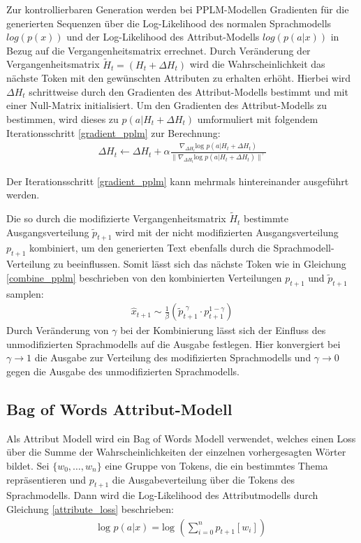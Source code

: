 Zur kontrollierbaren Generation werden bei PPLM-Modellen Gradienten für die generierten Sequenzen über die Log-Likelihood des normalen Sprachmodells $log(p(x))$ und der Log-Likelihood des Attribut-Modells $log(p(a|x))$ in Bezug auf die Vergangenheitsmatrix errechnet. 
Durch Veränderung der Vergangenheitsmatrix $\tilde{H}_t = (H_t+\Delta H_t)$ wird die Wahrscheinlichkeit das nächste Token mit den gewünschten Attributen zu erhalten erhöht. 
Hierbei wird $\Delta H_t$ schrittweise durch den Gradienten des Attribut-Modells bestimmt und mit einer Null-Matrix initialisiert.
Um den Gradienten des Attribut-Modells zu bestimmen, wird dieses zu $p(a|H_t+\Delta H_t)$ umformuliert mit folgendem Iterationsschritt \ref{gradient_pplm} zur Berechnung:
\begin{align}
    \label{gradient_pplm}
\Delta H_t \leftarrow \Delta H_t + \alpha \frac{\nabla_{\Delta H_t} \text{log }p(a|H_t+\Delta H_t)}{\| \nabla_{\Delta H_t} \text{log }p(a|H_t+\Delta H_t)\|^\gamma}
\end{align}

Der Iterationsschritt \ref{gradient_pplm} kann mehrmals hintereinander ausgeführt werden.

Die so durch die modifizierte Vergangenheitsmatrix $\tilde{H}_t$ bestimmte Ausgangsverteilung $\tilde{p}_{t+1}$ wird mit der nicht modifizierten Ausgangsverteilung $p_{t+1}$ kombiniert, um den generierten Text ebenfalls durch die Sprachmodell-Verteilung zu beeinflussen.
Somit lässt sich das nächste Token wie in Gleichung \ref{combine_pplm} beschrieben von den kombinierten Verteilungen $p_{t+1}$ und $\tilde{p}_{t+1}$ samplen: \begin{align} \label{combine_pplm}\hat{x}_{t+1} \sim \frac{1}{\beta} (\tilde{p}_{t+1}^{\text{ }\gamma} \cdot p_{t+1}^{1-\gamma})\end{align}
Durch Veränderung von $\gamma$ bei der Kombinierung lässt sich der Einfluss des unmodifizierten Sprachmodells auf die Ausgabe festlegen. Hier konvergiert bei $\gamma \rightarrow 1$ die Ausgabe zur Verteilung des modifizierten Sprachmodells und $\gamma \rightarrow 0$ gegen die Ausgabe des unmodifizierten Sprachmodells.




\subsection{Bag of Words Attribut-Modell}
Als Attribut Modell wird ein Bag of Words Modell verwendet, welches einen Loss über die Summe der Wahrscheinlichkeiten der einzelnen vorhergesagten Wörter bildet.
Sei $\{w_0, \ldots, w_n\}$ eine Gruppe von Tokens, die ein bestimmtes Thema repräsentieren und $p_{t+1}$ die Ausgabeverteilung über die Tokens des Sprachmodells.
Dann wird die Log-Likelihood des Attributmodells durch Gleichung \ref{attribute_loss} beschrieben: 
\begin{align}
    \label{attribute_loss}
    \text{log }p(a|x) = \text{log }(\sum_{i=0}^n p_{t+1}[w_i])
\end{align}

